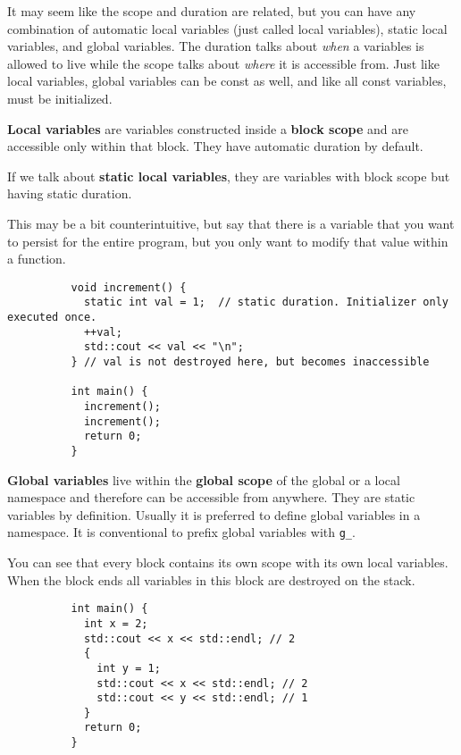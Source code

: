 \documentclass{article}
\begin{document}
      It may seem like the scope and duration are related, but you can have any combination of automatic local variables (just called local variables), static local variables, and global variables. The duration talks about \textit{when} a variables is allowed to live while the scope talks about \textit{where} it is accessible from. Just like local variables, global variables can be const as well, and like all const variables, must be initialized. 

      \begin{definition}
        \textbf{Local variables} are variables constructed inside a \textbf{block scope} and are accessible only within that block. They have automatic duration by default. 
      \end{definition}

      \begin{definition}
        If we talk about \textbf{static local variables}, they are variables with block scope but having static duration. 

        This may be a bit counterintuitive, but say that there is a variable that you want to persist for the entire program, but you only want to modify that value within a function. 
        \begin{lstlisting}
          void increment() {
            static int val = 1;  // static duration. Initializer only executed once. 
            ++val; 
            std::cout << val << "\n";
          } // val is not destroyed here, but becomes inaccessible 

          int main() {
            increment(); 
            increment(); 
            return 0; 
          }
        \end{lstlisting}
      \end{definition}

      \begin{definition}
        \textbf{Global variables} live within the \textbf{global scope} of the global or a local namespace and therefore can be accessible from anywhere. They are static variables by definition. Usually it is preferred to define global variables in a namespace. It is conventional to prefix global variables with \texttt{g\_}. 
      \end{definition}

      \begin{example}
        You can see that every block contains its own scope with its own local variables. When the block ends all variables in this block are destroyed on the stack. 

        \begin{lstlisting}
          int main() {  
            int x = 2; 
            std::cout << x << std::endl; // 2
            {
              int y = 1;
              std::cout << x << std::endl; // 2
              std::cout << y << std::endl; // 1
            }
            return 0; 
          }
        \end{lstlisting}
      \end{example}
\end{document}
